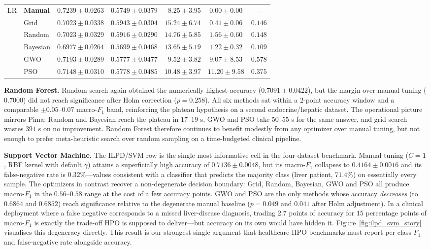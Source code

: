 \documentclass[letterpaper, 10 pt, conference]{ieeeconf}
\begin{document}
\begin{table}[t]
\begin{tabular}{|l|l|c|c|c|c|c|}
		\hline
		\multirow{6}{*}{LR}
		& \textbf{Manual}   & $\mathbf{0.7239 \pm 0.0263}$ & $0.5749 \pm 0.0379$ & $\phantom{0}8.25 \pm 3.95$ & $0.00 \pm 0.00$ & -- \\
		& Grid     & $0.7023 \pm 0.0338$ & $0.5943 \pm 0.0304$ & $15.24 \pm 6.74$ & $0.41 \pm 0.06$ & $0.146$ \\
		& Random   & $0.7023 \pm 0.0329$ & $0.5916 \pm 0.0290$ & $14.76 \pm 5.85$ & $1.56 \pm 0.60$ & $0.148$ \\
		& Bayesian & $0.6977 \pm 0.0264$ & $0.5699 \pm 0.0468$ & $13.65 \pm 5.19$ & $1.22 \pm 0.32$ & $0.109$ \\
		& GWO      & $0.7193 \pm 0.0289$ & $0.5777 \pm 0.0477$ & $\phantom{0}9.52 \pm 3.82$ & $9.07 \pm 8.53$ & $0.578$ \\
		& PSO      & $0.7148 \pm 0.0310$ & $0.5778 \pm 0.0485$ & $10.48 \pm 3.97$ & $11.20 \pm 9.58$ & $0.375$ \\
		\hline
	\end{tabular}
\end{table}

\textbf{Random Forest.} Random search again obtained the numerically highest accuracy ($0.7091 \pm 0.0422$), but the margin over manual tuning ($0.7000$) did not reach significance after Holm correction ($p = 0.258$). All six methods sat within a $2$-point accuracy window and a comparable $\pm 0.05$--$0.07$ macro-$F_1$ band, reinforcing the plateau hypothesis on a second endocrine/hepatic dataset. The operational picture mirrors Pima: Random and Bayesian reach the plateau in $17$--$19$ s, GWO and PSO take $50$--$55$ s for the same answer, and grid search wastes $391$ s on no improvement. Random Forest therefore continues to benefit modestly from any optimizer over manual tuning, but not enough to prefer meta-heuristic search over random sampling on a time-budgeted clinical pipeline.

\textbf{Support Vector Machine.} The ILPD/SVM row is the single most informative cell in the four-dataset benchmark. Manual tuning ($C = 1$, RBF kernel with default $\gamma$) attains a superficially high accuracy of $0.7136 \pm 0.0048$, but its macro-$F_1$ collapses to $0.4164 \pm 0.0016$ and its false-negative rate is $0.32\%$---values consistent with a classifier that predicts the majority class (liver patient, $71.4\%$) on essentially every sample. The optimizers in contrast recover a non-degenerate decision boundary: Grid, Random, Bayesian, GWO and PSO all produce macro-$F_1$ in the $0.56$--$0.58$ range at the cost of a few accuracy points. GWO and PSO are the only methods whose accuracy \emph{decreases} (to $0.6864$ and $0.6852$) reach significance relative to the degenerate manual baseline ($p = 0.049$ and $0.041$ after Holm adjustment). In a clinical deployment where a false negative corresponds to a missed liver-disease diagnosis, trading $2.7$ points of accuracy for $15$ percentage points of macro-$F_1$ is exactly the trade-off HPO is supposed to deliver---but accuracy on its own would have hidden it. Figure~\ref{fig:ilpd_svm_story} visualises this degeneracy directly. This result is our strongest single argument that healthcare HPO benchmarks must report per-class $F_1$ and false-negative rate alongside accuracy.
\end{document}

